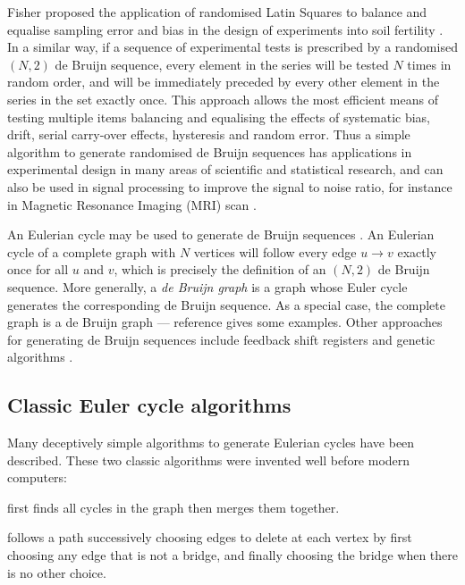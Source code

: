 \documentclass[prodmode,acmtecs]{acmsmall} %
\begin{document}
Fisher proposed the application of randomised Latin Squares to balance and equalise sampling error and bias in the design of experiments into soil fertility \cite{fisher}. 
In a similar way, if a sequence of experimental tests is prescribed by a randomised $(N,2)$ de Bruijn sequence, every element in the series will be tested $N$ times in random order, and will be immediately preceded by every other element in the series in the set exactly once. This approach allows the most efficient means of testing multiple items balancing and equalising the effects of systematic bias, drift, serial carry-over effects, hysteresis and random error. Thus a simple algorithm to generate randomised de Bruijn sequences has applications in experimental design in many areas of scientific and statistical research,  and can also be used in signal processing to improve the signal to noise ratio, for instance in Magnetic Resonance Imaging (MRI) scan \cite{aguirre}.

An Eulerian cycle may be used to generate de Bruijn sequences \cite{fleury,hierholzer}. An Eulerian cycle of a complete graph with $N$ vertices will follow every edge $u \rightarrow v$ exactly once for all $u$ and $v$, which is precisely the definition of an $(N,2)$ de Bruijn sequence. More generally, a \emph{de Bruijn graph\/} is a graph whose Euler cycle generates the corresponding de Bruijn sequence. As a special case, the complete graph is a de Bruijn graph --- reference \cite{good} gives some examples. Other approaches for generating de Bruijn sequences include feedback shift registers and genetic algorithms \cite{turan,knuth4a}.%

\subsection{Classic Euler cycle algorithms}\label{new-algorithm}
Many deceptively simple algorithms to generate Eulerian cycles have been described. These two classic algorithms were invented well before modern computers:

\begin{description}\raggedright
\item[Hierholzer's algorithm] \cite{hierholzer} first finds all cycles in the graph then merges them together. 
\item[Fluery's algorithm] \cite{fleury} follows a path successively choosing edges to delete at each vertex by first choosing any edge that is not a bridge, and finally choosing the bridge when there is no other choice.
\end{description}
\end{document}
